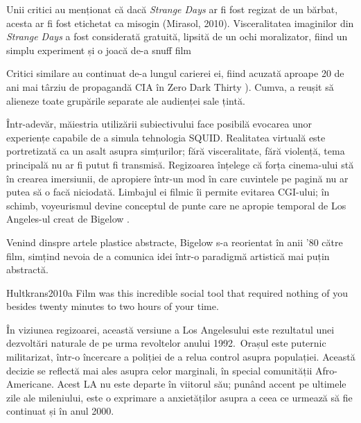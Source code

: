 \documentclass[12pt]{article}
\begin{document}
	Unii critici au menționat că dacă \textit{Strange Days} ar fi fost regizat de un bărbat, acesta ar fi fost etichetat ca misogin (Mirasol, 2010). Visceralitatea imaginilor din \textit{Strange Days} a fost considerată gratuită, lipsită de un ochi moralizator, fiind un simplu experiment și o joacă de-a snuff film \parencite{Guthmann1995a,Denby} 
	
	Critici similare au continuat de-a lungul carierei ei, fiind acuzată aproape 20 de ani mai târziu de propagandă CIA în Zero Dark Thirty \parencite{Vishnevetsky2012a}). Cumva, a reușit să alieneze toate grupările separate ale audienței sale țintă.\par
	
	Într-adevăr, măiestria utilizării subiectivului face posibilă evocarea unor experiențe capabile de a simula tehnologia \dedouble SQUID\sqtworight. Realitatea virtuală este portretizată ca un asalt asupra simțurilor; fără visceralitate, fără violență, tema principală nu ar fi putut fi transmisă. Regizoarea înțelege că forța cinema-ului stă în crearea imersiunii, de apropiere într-un mod în care cuvintele pe pagină nu ar putea să o facă niciodată. Limbajul ei filmic îi permite evitarea CGI-ului; în schimb, voyeurismul devine conceptul de punte care ne apropie temporal de Los Angeles-ul creat de Bigelow \parencite{Hultkrans2010a}.\par 
	
	Venind dinspre artele plastice abstracte, Bigelow s-a reorientat în anii '80 către film, simțind nevoia de a comunica idei într-o paradigmă artistică mai puțin abstractă.\par
	
	\begin{displaycquote}{Hultkrans2010a}
		Film was this incredible social tool that required nothing of you besides twenty minutes to two hours of your time.
	\end{displaycquote}
	
	În viziunea regizoarei, această versiune a Los Angelesului este rezultatul unei dezvoltări naturale de pe urma revoltelor anului 1992. Orașul este puternic militarizat, într-o încercare a poliției de a relua control asupra populației. Această decizie se reflectă mai ales asupra celor marginali, în special comunității Afro-Americane. Acest LA nu este departe în viitorul său; punând accent pe ultimele zile ale mileniului, este o exprimare a anxietăților asupra a ceea ce urmează să fie continuat și în anul 2000.\par
	
\end{document}
